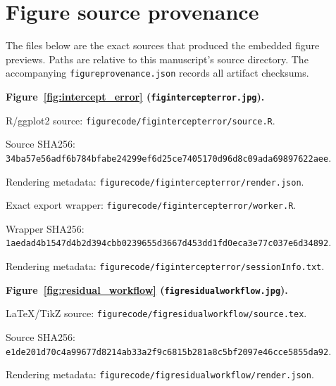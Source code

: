 \documentclass[11pt]{article}
\begin{document}
\clearpage
\section*{Figure source provenance}
The files below are the exact sources that produced the embedded figure previews. Paths are relative to this manuscript's source directory. The accompanying \texttt{figureprovenance.json} records all artifact checksums.\par
\medskip\noindent\textbf{Figure~\ref{fig:intercept_error} (\texttt{figintercepterror.jpg}).}\par
\noindent R/ggplot2 source: \texttt{figurecode/\allowbreak{}figintercepterror/\allowbreak{}source.R}.\par
\noindent Source SHA256: \texttt{34ba57e5\allowbreak{}6adf6b78\allowbreak{}4bfabe24\allowbreak{}299ef6d2\allowbreak{}5ce74051\allowbreak{}70d96d8c\allowbreak{}09ada698\allowbreak{}97622aee}.\par
\noindent Rendering metadata: \texttt{figurecode/\allowbreak{}figintercepterror/\allowbreak{}render.json}.\par
\noindent Exact export wrapper: \texttt{figurecode/\allowbreak{}figintercepterror/\allowbreak{}worker.R}.\par
\noindent Wrapper SHA256: \texttt{1aedad4b\allowbreak{}1547d4b2\allowbreak{}d394cbb0\allowbreak{}239655d3\allowbreak{}667d453d\allowbreak{}d1fd0eca\allowbreak{}3e77c037\allowbreak{}e6d34892}.\par
\noindent Rendering metadata: \texttt{figurecode/\allowbreak{}figintercepterror/\allowbreak{}sessionInfo.txt}.\par
\medskip\noindent\textbf{Figure~\ref{fig:residual_workflow} (\texttt{figresidualworkflow.jpg}).}\par
\noindent LaTeX/TikZ source: \texttt{figurecode/\allowbreak{}figresidualworkflow/\allowbreak{}source.tex}.\par
\noindent Source SHA256: \texttt{e1de201d\allowbreak{}70c4a996\allowbreak{}77d8214a\allowbreak{}b33a2f9c\allowbreak{}6815b281\allowbreak{}a8c5bf20\allowbreak{}97e46cce\allowbreak{}5855da92}.\par
\noindent Rendering metadata: \texttt{figurecode/\allowbreak{}figresidualworkflow/\allowbreak{}render.json}.\par
\end{document}
